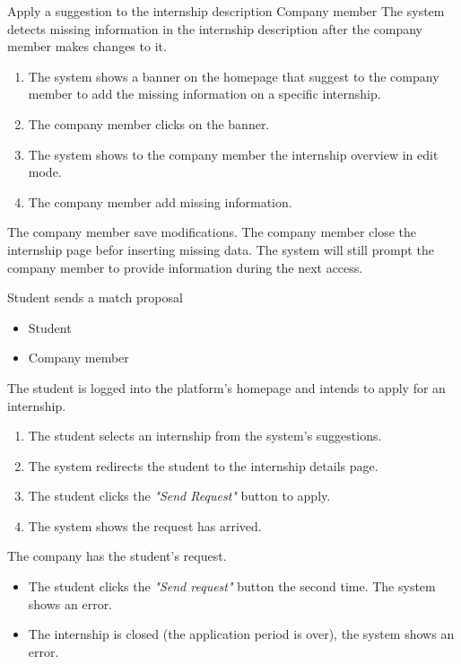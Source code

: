 \usecase
{Apply a suggestion to the internship description}
{
    Company member
}
{
    The system detects missing information in the internship description after the company member makes changes to it.
}
{
    \begin{enumerate}
        \item The system shows a banner on the homepage that suggest to the company member to add the missing information on a specific internship.
        \item The company member clicks on the banner.
        \item The system shows to the company member the internship overview in edit mode.
        \item The company member add missing information.
    \end{enumerate}
}
{
    The company member save modifications.
}
{
    The company member close the internship page befor inserting missing data. The system will still prompt the company member to provide information during the next access.
}
{

}

\usecase
{Student sends a match proposal}
{
    \begin{itemize}
        \item Student   
        \item Company member
    \end{itemize}
}
{
    The student is logged into the platform's homepage and intends to apply for an internship.
}
{
    \begin{enumerate}
        \item The student selects an internship from the system's suggestions.
        \item The system redirects the student to the internship details page.
        \item The student clicks the \textit{"Send Request"} button to apply.
        \item The system shows the request has arrived. 
    \end{enumerate}
}
{
    The company has the student's request.
}
{
    \begin{itemize}
        \item The student clicks the \textit{"Send request"} button the second time. The system shows an error.
        \item The internship is closed (the application period is over), the system shows an error.
    \end{itemize}
}
{}

